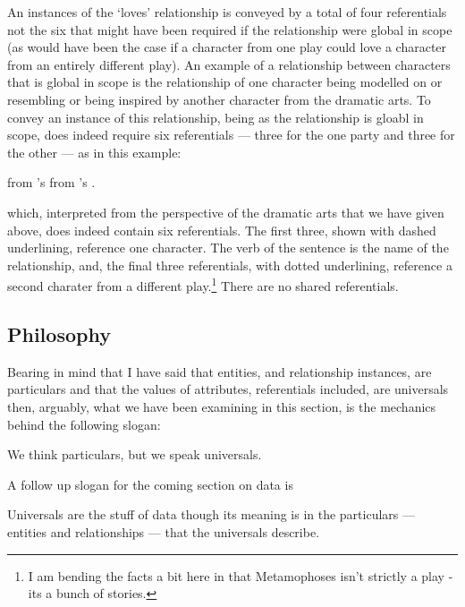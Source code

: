 An instances of the `loves' relationship is conveyed by a total of four referentials
 not the six that might have been required
if the relationship were global in scope (as would have been the case if a
 character from one play could love  a character from an entirely different play).
 An example of a relationship between characters that is global in scope 
 is the relationship of one character being modelled on or resembling or being inspired 
 by another character from the dramatic arts.
 To convey an instance of this relationship, being as the relationship is gloabl in scope,  does indeed require
 six referentials --- three for the one party and three for the other --- as in this example:
\begin{erquote}
\parbox{9.0cm}{\linespread{1.3}\normalsize
{} from 's 
            from 's .}
\end{erquote}
which, interpreted from the perspective of the dramatic arts that we have given above, does indeed contain six referentials. 
The first three, shown with dashed underlining, reference one character.
The verb of the sentence is the name of the relationship, and, 
the final three referentials, with dotted underlining, 
reference a second charater from a different play.\footnote{I am bending the facts a bit here 
in that Metamophoses isn't strictly a play - its a bunch of stories.} 
There are no shared referentials.


\subsection{Philosophy}
\mynote
Bearing in mind that I have said that entities, and relationship instances, are particulars
and that the values of attributes, referentials included, are universals then, arguably,
 what we have been examining in this section, 
 is the mechanics behind the following slogan:
\begin{erquote}
We think particulars, but we speak universals.
\end{erquote}
\begin{noteforfuture}
\mynote
A follow up slogan for the coming section on data is
\begin{erquote}
Universals are the stuff of data though its meaning is in the 
particulars --- entities and relationships --- that the universals describe. 
\end{erquote}
\end{noteforfuture}





 
